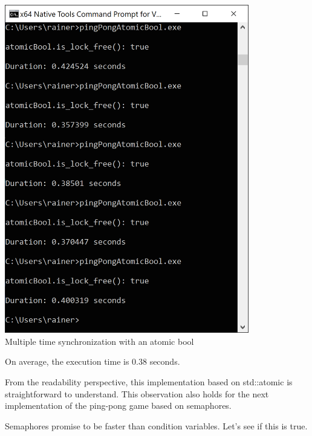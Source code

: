 \begin{center}
\includegraphics[width=0.8\textwidth]{content/3/chapter7/images/5.png}\\
Multiple time synchronization with an atomic bool
\end{center}

On average, the execution time is 0.38 seconds.

From the readability perspective, this implementation based on std::atomic is straightforward to understand. This observation also holds for the next implementation of the ping-pong game based on semaphores.


Semaphores promise to be faster than condition variables. Let’s see if this is true.

